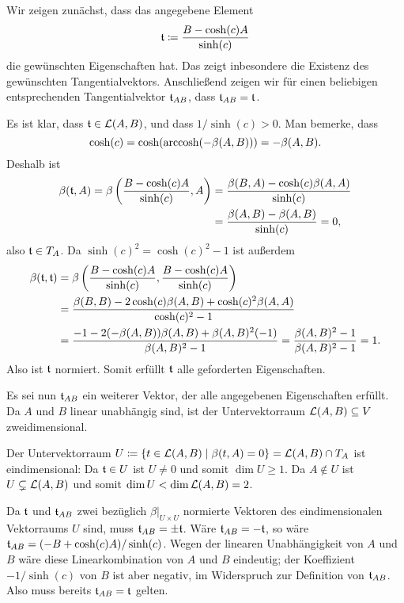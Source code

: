 \documentclass[a4paper,10pt,numbers=noenddot]{scrartcl}
\begin{document}
Wir zeigen zunächst, dass das angegebene Element
\[
  \mathfrak{t}
  \coloneqq
  \frac{B - \cosh(c) A}{\sinh(c)}
\]
die gewünschten Eigenschaften hat.
Das zeigt inbesondere die Existenz des gewünschten Tangentialvektors.
Anschließend zeigen wir für einen beliebigen entsprechenden Tangentialvektor $\mathfrak{t}_{AB}$, dass $\mathfrak{t}_{AB} = \mathfrak{t}$.

Es ist klar, dass $\mathfrak{t} \in \operatorname{\mathcal{L}}(A,B)$, und dass $1/\sinh(c) > 0$.
Man bemerke, dass
\[
  \cosh(c) = \cosh(\operatorname{arccosh}(-\beta(A,B))) = -\beta(A,B).
\]
Deshalb ist
\begin{align*}
      \beta(\mathfrak{t}, A)
   =  \beta\left( \frac{B - \cosh(c) A}{\sinh(c)}, A \right)
  &=  \frac{\beta(B, A) - \cosh(c) \beta(A,A)}{\sinh(c)}      \\
  &=  \frac{\beta(A,B) - \beta(A,B)}{\sinh(c)}
   =  0,
\end{align*}
also $\mathfrak{t} \in T_A$.
Da $\sinh(c)^2 = \cosh(c)^2 - 1$ ist außerdem
\begin{align*}
      \beta(\mathfrak{t}, \mathfrak{t})
  &=  \beta\left( \frac{B - \cosh(c) A}{\sinh(c)}, \frac{B - \cosh(c) A}{\sinh(c)} \right)    \\
  &=  \frac{ \beta(B, B) - 2 \cosh(c) \beta(A,B) + \cosh(c)^2 \beta(A,A) }{ \cosh(c)^2 - 1 }  \\
  &=  \frac{ -1 - 2 (- \beta(A, B)) \beta(A,B) + \beta(A,B)^2 (-1) }{ \beta(A,B)^2 - 1 }
   =  \frac{ \beta(A, B)^2 - 1 }{ \beta(A, B)^2 - 1 }
   =  1.
\end{align*}
Also ist $\mathfrak{t}$ normiert.
Somit erfüllt $\mathfrak{t}$ alle geforderten Eigenschaften.

Es sei nun $\mathfrak{t}_{AB}$ ein weiterer Vektor, der alle angegebenen Eigenschaften erfüllt.
Da $A$ und $B$ linear unabhängig sind, ist der Untervektorraum $\operatorname{\mathcal{L}}(A,B) \subseteq V$ zweidimensional.

Der Untervektorraum $U \coloneqq \{t \in \operatorname{\mathcal{L}}(A,B) \mid \beta(t,A) = 0\} = \operatorname{\mathcal{L}}(A,B) \cap T_A$ ist eindimensional: Da $\mathfrak{t} \in U$ ist $U \neq 0$ und somit $\dim U \geq 1$.
Da $A \notin U$ ist $U \subsetneq \operatorname{\mathcal{L}}(A,B)$ und somit $\dim U < \dim \operatorname{\mathcal{L}}(A,B) = 2$.

Da $\mathfrak{t}$ und $\mathfrak{t}_{AB}$ zwei bezüglich $\beta|_{U \times U}$ normierte Vektoren des eindimensionalen Vektorraums $U$ sind, muss $\mathfrak{t}_{AB} = \pm \mathfrak{t}$.
Wäre $\mathfrak{t}_{AB} = -\mathfrak{t}$, so wäre $\mathfrak{t}_{AB} = (-B + \cosh(c) A)/\sinh(c)$.
Wegen der linearen Unabhängigkeit von $A$ und $B$ wäre diese Linearkombination von $A$ und $B$ eindeutig; der Koeffizient $-1/\sinh(c)$ von $B$ ist aber negativ, im Widerspruch zur Definition von $\mathfrak{t}_{AB}$.
Also muss bereits $\mathfrak{t}_{AB} = \mathfrak{t}$ gelten.
\end{document}
